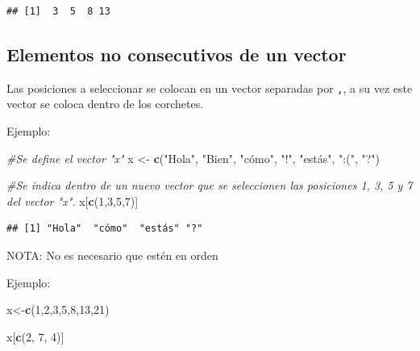 \documentclass[
]{book}
\newenvironment{Shaded}{\begin{snugshade}}{\end{snugshade}}
\newcommand{\CommentTok}[1]{\textcolor[rgb]{0.56,0.35,0.01}{\textit{#1}}}
\newcommand{\DecValTok}[1]{\textcolor[rgb]{0.00,0.00,0.81}{#1}}
\newcommand{\FunctionTok}[1]{\textcolor[rgb]{0.13,0.29,0.53}{\textbf{#1}}}
\newcommand{\NormalTok}[1]{#1}
\newcommand{\OtherTok}[1]{\textcolor[rgb]{0.56,0.35,0.01}{#1}}
\newcommand{\StringTok}[1]{\textcolor[rgb]{0.31,0.60,0.02}{#1}}
\begin{document}
\begin{verbatim}
## [1]  3  5  8 13
\end{verbatim}

\subsection{Elementos no consecutivos de un vector}\label{elementos-no-consecutivos-de-un-vector}

Las posiciones a seleccionar se colocan en un vector separadas por \texttt{,}, a su vez este vector se coloca dentro de los corchetes.

Ejemplo:

\begin{Shaded}
\begin{Highlighting}[]
\CommentTok{\#Se define el vector "x"}
\NormalTok{x }\OtherTok{\textless{}{-}} \FunctionTok{c}\NormalTok{(}\StringTok{"Hola"}\NormalTok{, }\StringTok{"Bien"}\NormalTok{, }\StringTok{"cómo"}\NormalTok{, }\StringTok{"!"}\NormalTok{, }\StringTok{"estás"}\NormalTok{, }\StringTok{":("}\NormalTok{, }\StringTok{"?"}\NormalTok{)}

\CommentTok{\#Se indica dentro de un nuevo vector que se seleccionen las posiciones 1, 3, 5 y 7 del vector "x". }
\NormalTok{x[}\FunctionTok{c}\NormalTok{(}\DecValTok{1}\NormalTok{,}\DecValTok{3}\NormalTok{,}\DecValTok{5}\NormalTok{,}\DecValTok{7}\NormalTok{)]}
\end{Highlighting}
\end{Shaded}

\begin{verbatim}
## [1] "Hola"  "cómo"  "estás" "?"
\end{verbatim}

NOTA: No es necesario que estén en orden

Ejemplo:

\begin{Shaded}
\begin{Highlighting}[]
\NormalTok{x}\OtherTok{\textless{}{-}}\FunctionTok{c}\NormalTok{(}\DecValTok{1}\NormalTok{,}\DecValTok{2}\NormalTok{,}\DecValTok{3}\NormalTok{,}\DecValTok{5}\NormalTok{,}\DecValTok{8}\NormalTok{,}\DecValTok{13}\NormalTok{,}\DecValTok{21}\NormalTok{)}

\NormalTok{x[}\FunctionTok{c}\NormalTok{(}\DecValTok{2}\NormalTok{, }\DecValTok{7}\NormalTok{, }\DecValTok{4}\NormalTok{)]}
\end{Highlighting}
\end{Shaded}
\end{document}
